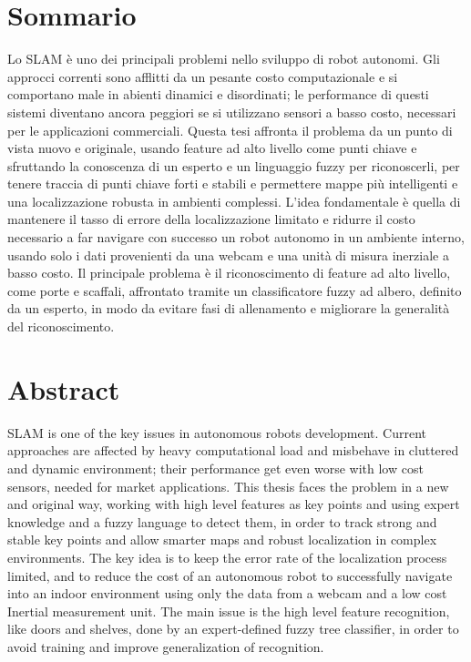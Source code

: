 \newpage
\chapter*{Sommario}


Lo SLAM è uno dei principali problemi nello sviluppo di robot autonomi. Gli approcci correnti sono afflitti da un pesante costo computazionale e si comportano male in abienti dinamici e disordinati; le performance di questi sistemi diventano ancora peggiori se si utilizzano sensori a basso costo, necessari per le applicazioni commerciali.
Questa tesi affronta il problema da un punto di vista nuovo e originale, usando feature ad alto livello come punti chiave e sfruttando la conoscenza di un esperto e un linguaggio fuzzy per riconoscerli, per tenere traccia di punti chiave forti e stabili e permettere mappe più intelligenti e una localizzazione robusta in ambienti complessi. L'idea fondamentale è quella di mantenere il tasso di errore della localizzazione limitato e ridurre il costo necessario a far navigare con successo un robot autonomo in un ambiente interno, usando solo i dati provenienti da una webcam e una unità di misura inerziale a basso costo.
Il principale problema è il riconoscimento di feature ad alto livello, come porte e scaffali, affrontato tramite un classificatore fuzzy ad albero, definito da un esperto, in modo da evitare fasi di allenamento e migliorare la generalità del riconoscimento.

\chapter*{Abstract}


SLAM is one of the key issues in autonomous robots development. Current approaches are affected by heavy computational load and misbehave in cluttered and dynamic environment; their performance get even worse with low cost sensors, needed for market applications.
This thesis faces the problem in a new and original way, working with high level features as key points and using expert knowledge and a fuzzy language to detect them, in order to track strong and stable key points and allow smarter maps and robust localization in complex environments. The key idea is to keep the error rate of the localization process limited, and to reduce the cost of an autonomous robot to successfully navigate into an indoor environment using only the data from a webcam and a low cost Inertial measurement unit.
The main issue is the high level feature recognition, like doors and shelves, done by an expert-defined fuzzy tree classifier, in order to avoid training and improve generalization of recognition.